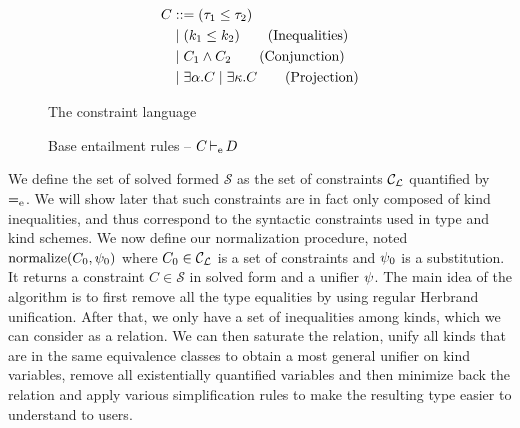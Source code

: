 \begin{figure}[!bt]
  \centering
  \begin{minipage}{0.32\linewidth}
    \begin{align*}
      C &::= (\tau_1 \leq \tau_2) \\
        &\mid (k_1 \leq k_2) \tag{Inequalities} \\
        &\mid C_1 \wedge C_2  \tag{Conjunction}\\
        &\mid \exists \alpha.C
        \mid \exists \kappa.C \tag{Projection}
    \end{align*}
    \caption{The constraint language}
    \label{grammar:constraint}
  \end{minipage}\hfill
  \begin{minipage}{0.66\linewidth}
    \caption{Base entailment rules -- $C \operatorname{\vdash_e} D$ }
    \label{rules:entail}
  \end{minipage}
\end{figure}

We define the set of solved formed
$\mathcal S$ as the set of constraints ${\mathcal C_{\mathcal L}}$ quantified by $\operatorname{=_e}$.
We will show later that such constraints are in fact only composed of
kind inequalities, and thus correspond to the syntactic constraints
used in type and kind schemes.
%
We now define our normalization procedure, noted $\operatorname{normalize}(C_0,\mathrm{\psi}_0)$ where
$C_0\in {\mathcal C_{\mathcal L}}$ is a set of constraints and $\mathrm{\psi}_0$ is a substitution.
It returns a constraint $C \in \mathcal S$ in
solved form and a unifier $\mathrm{\psi}$.
The main idea of the algorithm is to first remove all the type equalities
by using regular Herbrand unification. After that, we only have
a set of inequalities among kinds, which we can consider as a relation.
We can then saturate the relation,
unify all kinds that are in the same equivalence classes to obtain
a most general unifier on kind variables,
remove all existentially quantified variables and
then minimize back the relation and apply various
simplification rules to make the resulting type easier to understand to users.

